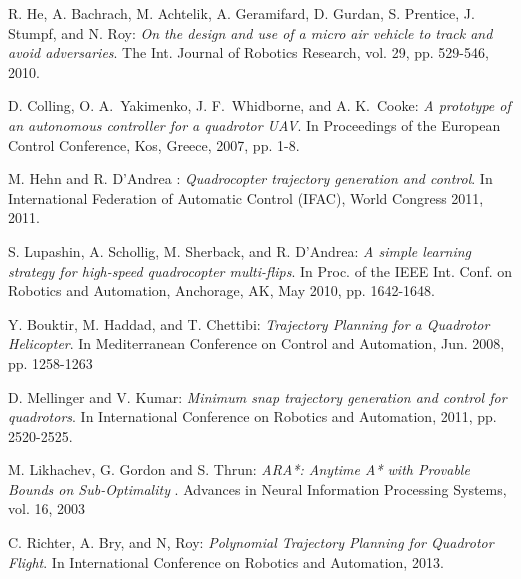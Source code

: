 
\begin{thebibliography}{99}



 {\sc R. He, A. Bachrach, M. Achtelik, A. Geramifard, D. Gurdan, S. Prentice,
J. Stumpf, and N. Roy}: 
{\it On the design and use of a micro air
vehicle to track and avoid adversaries}. The Int. Journal of Robotics
Research, vol. 29, pp. 529-546, 2010.


 {\sc D. Colling, O. A.~Yakimenko, J. F.~Whidborne, and A. K.~Cooke}:
{\it A prototype of an autonomous controller for a quadrotor UAV}. In
Proceedings of the European Control Conference, Kos, Greece, 2007,
pp. 1-8.


 {\sc M. Hehn and R. D'Andrea }:
{\it Quadrocopter trajectory generation and control}. In
International Federation of Automatic Control (IFAC), World Congress 2011, 2011.


 {\sc S. Lupashin, A. Schollig, M. Sherback, and R. D'Andrea}:
 {\it A simple learning strategy for high-speed quadrocopter multi-flips}.
In Proc. of the IEEE Int. Conf. on Robotics and Automation, Anchorage, AK,
May 2010, pp. 1642-1648.


 {\sc Y. Bouktir, M. Haddad, and T. Chettibi}:
{\it Trajectory Planning for a
Quadrotor Helicopter}. In Mediterranean Conference on Control and
Automation, Jun. 2008, pp. 1258-1263


 {\sc D. Mellinger and V. Kumar}: 
{\it Minimum snap trajectory generation and
control for quadrotors}. In International Conference on Robotics and
Automation, 2011, pp. 2520-2525.

 {\sc M. Likhachev, G. Gordon and S. Thrun}: 
{\it  ARA*: Anytime A* with Provable Bounds on Sub-Optimality }.
Advances in Neural Information
Processing Systems, vol. 16, 2003

 {\sc C. Richter,  A. Bry, and N, Roy}: 
{\it  Polynomial Trajectory Planning
for Quadrotor Flight}.
In International Conference on Robotics and
Automation, 2013.



\end{thebibliography}
